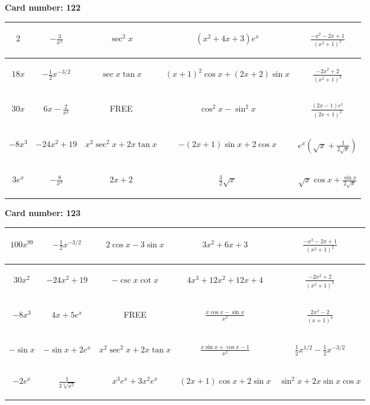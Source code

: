 \documentclass{article}
\newcommand{\entry}[1]{\begin{minipage}[t][2.75cm][t]{4cm} \vspace{1cm} \begin{center}#1\end{center} \end{minipage}}
\newcommand{\freespace}{\entry{FREE}}
\newcommand{\cardnumber}[1]{\noindent \textbf{Card number: #1} \bigskip}
\begin{document}
\pagebreak

\cardnumber{122}
\begin{center}
\begin{tabular}{|*{5}{c|}}
    \hline
    \entry{$2$} & \entry{$-\frac{3}{x^2}$} & \entry{$\sec^2 x$} & \entry{$(x^2 + 4x + 3) e^x$} & \entry{$\frac{-x^2 - 2x + 1}{(x^2 + 1)^2}$} \\ \hline
    \entry{$18x$} & \entry{$-\frac{1}{2} x^{-3/2}$} & \entry{$\sec x \tan x$} & \entry{$(x + 1)^2 \cos x + (2x + 2) \sin x$} & \entry{$\frac{-2x^2 + 2}{(x^2 + 1)^2}$} \\ \hline
    \entry{$30x$} & \entry{$6x - \frac{2}{x^2}$} & \freespace & \entry{$\cos^2 x - \sin^2 x$} & \entry{$\frac{(2x - 1) e^x}{(2x + 1)^2}$} \\ \hline
    \entry{$-8x^3$} & \entry{$-24x^2 + 19$} & \entry{$x^2 \sec^2 x + 2x \tan x$} & \entry{$-(2x + 1) \sin x + 2 \cos x$} & \entry{$e^x \left(\sqrt{x} + \frac{1}{2\sqrt{x}}\right)$} \\ \hline
    \entry{$3e^x$} & \entry{$-\frac{8}{x^3}$} & \entry{$2x + 2$} & \entry{$\frac{3}{2} \sqrt{x}$} & \entry{$\sqrt{x} \cos x + \frac{\sin x}{2 \sqrt{x}}$} \\ \hline
\end{tabular}
\end{center}

\pagebreak

\cardnumber{123}
\begin{center}
\begin{tabular}{|*{5}{c|}}
    \hline
    \entry{$100x^{99}$} & \entry{$-\frac{1}{2} x^{-3/2}$} & \entry{$2 \cos x - 3 \sin x$} & \entry{$3x^2 + 6x + 3$} & \entry{$\frac{-x^2 - 2x + 1}{(x^2 + 1)^2}$} \\ \hline
    \entry{$30x^2$} & \entry{$-24x^2 + 19$} & \entry{$-\csc x \cot x$} & \entry{$4x^3 + 12x^2 + 12x + 4$} & \entry{$\frac{-2x^2 + 2}{(x^2 + 1)^2}$} \\ \hline
    \entry{$-8x^3$} & \entry{$4x + 5e^x$} & \freespace & \entry{$\frac{x \cos x - \sin x}{x^2}$} & \entry{$\frac{2x^2 - 2}{(x + 1)^4}$} \\ \hline
    \entry{$-\sin x$} & \entry{$-\sin x + 2e^x$} & \entry{$x^2 \sec^2 x + 2x \tan x$} & \entry{$\frac{x \sin x + \cos x - 1}{x^2}$} & \entry{$\frac{1}{2} x^{1/2} - \frac{1}{2} x^{-3/2}$} \\ \hline
    \entry{$-2e^x$} & \entry{$\frac{1}{3\sqrt[3]{x^2}}$} & \entry{$x^3 e^x + 3x^2 e^x$} & \entry{$(2x + 1) \cos x + 2 \sin x$} & \entry{$\sin^2 x + 2x \sin x \cos x$} \\ \hline
\end{tabular}
\end{center}
\end{document}
